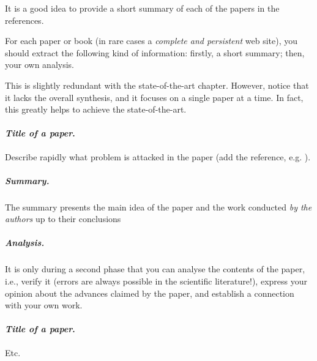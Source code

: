 \label{app:FichesLecture}

It is a good idea to provide a short summary of each of the papers in the references.

For each paper or book (in rare cases a \emph{complete and persistent} web site), you should extract the following kind of information:  firstly, a short summary;  then, your own analysis.

This is slightly redundant with the state-of-the-art chapter. However, notice that it lacks the overall synthesis, and it focuses on a single paper at a time.  In fact, this greatly helps to achieve the state-of-the-art.

\paragraph{\emph{Title of a paper}.}

Describe rapidly what problem is attacked in the paper (add the reference, e.g. \cite{Pascal-1671}).

\subparagraph{Summary.}

The summary presents the main idea of the paper and the work conducted \emph{by the authors} up to their conclusions

\subparagraph{Analysis.}

It is only during a second phase that you can analyse the contents of the paper, i.e., verify it (errors are always possible in the scientific literature!), express your opinion about the advances claimed by the paper, and establish a connection with your own work.

\paragraph{\emph{Title of a paper}.}

Etc.
